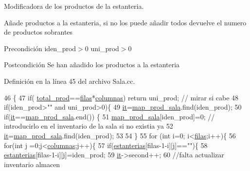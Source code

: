 Modificadora de los productos de la estanteria. 

Añade productos a la estanteria, si no los puede añadir todos devuelve el numero de productos sobrantes \begin{DoxyPrecond}{Precondición}
iden\+\_\+prod$>$0 uni\+\_\+prod$>$0 
\end{DoxyPrecond}
\begin{DoxyPostcond}{Postcondición}
Se han añadido los productos a la estanteria 
\end{DoxyPostcond}


Definición en la línea 45 del archivo Sala.\+cc.


\begin{DoxyCode}
46 \{
47     \textcolor{keywordflow}{if}( \hyperlink{class_sala_aeb64df257f47ad63fe1ba3b163255e14}{total\_prod}==\hyperlink{class_sala_a4cccb03763eea3ebd6d192491b25f7dc}{filas}*\hyperlink{class_sala_af3c278931f26e28e77fa363e9be82000}{columnas}) \textcolor{keywordflow}{return} uni\_prod; \textcolor{comment}{// mirar si cabe}
48     \textcolor{keywordflow}{if}(iden\_prod>\textcolor{stringliteral}{""} and uni\_prod>0)\{
49         \hyperlink{class_sala_a1cc789ab041a9e3011f9eec9357e8fb0}{it}=\hyperlink{class_sala_a1ee09851cf1735dc48ab69a91952e250}{map\_prod\_sala}.find(iden\_prod);
50         \textcolor{keywordflow}{if}(\hyperlink{class_sala_a1cc789ab041a9e3011f9eec9357e8fb0}{it}==\hyperlink{class_sala_a1ee09851cf1735dc48ab69a91952e250}{map\_prod\_sala}.end()) \{
51             \hyperlink{class_sala_a1ee09851cf1735dc48ab69a91952e250}{map\_prod\_sala}[iden\_prod]=0;            \textcolor{comment}{// introducirlo en el inventario de la sala
       si no existia ya}
52             \hyperlink{class_sala_a1cc789ab041a9e3011f9eec9357e8fb0}{it}=\hyperlink{class_sala_a1ee09851cf1735dc48ab69a91952e250}{map\_prod\_sala}.find(iden\_prod);
53             
54         \}
55         \textcolor{keywordflow}{for} (\textcolor{keywordtype}{int} i=0; i<\hyperlink{class_sala_a4cccb03763eea3ebd6d192491b25f7dc}{filas};i++)\{
56             \textcolor{keywordflow}{for}(\textcolor{keywordtype}{int} j =0;j<\hyperlink{class_sala_af3c278931f26e28e77fa363e9be82000}{columnas};j++)\{
57                 \textcolor{keywordflow}{if}(\hyperlink{class_sala_a88aae17b7e590770fe8115b41da2e26a}{estanterias}[filas-1-i][j]==\textcolor{stringliteral}{""})\{
58                     \hyperlink{class_sala_a88aae17b7e590770fe8115b41da2e26a}{estanterias}[filas-1-i][j]=iden\_prod;
59                     \hyperlink{class_sala_a1cc789ab041a9e3011f9eec9357e8fb0}{it}->second++;
60                     \textcolor{comment}{//falta actualizar inventario almacen}

\end{DoxyCode}
